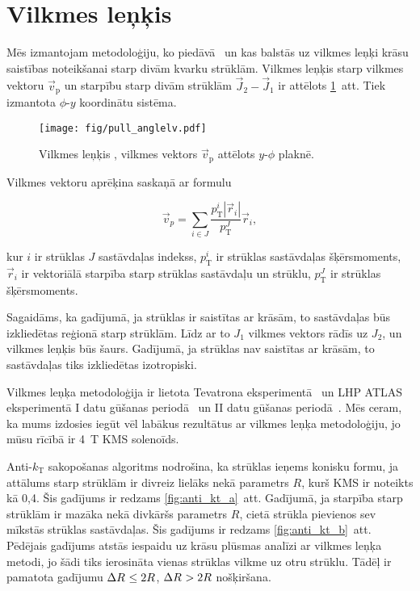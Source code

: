 \section{Vilkmes leņķis}

Mēs izmantojam metodoloģiju, ko piedāvā~\cite{Gallicchio:2010sw} un kas balstās uz vilkmes leņķi krāsu saistības noteikšanai starp divām kvarku strūklām. Vilkmes leņķis \pullangle starp vilkmes vektoru $\vec{v}_{\text{p}}$ un starpību starp divām strūklām $\vec{J}_{2}-\vec{J}_{1}$ ir attēlots \ref{fig:pull_angle}~att. Tiek izmantota $\phi$-$y$ koordinātu sistēma. 

\begin{figure}[hbtp]
  \centering
  \texttt{[image: fig/pull\_anglelv.pdf]}
  \caption{Vilkmes leņķis \pullangle, vilkmes vektors $\vec{v}_{\text{p}}$ attēlots $y$-$\phi$ plaknē.}
  \label{fig:pull_angle}
\end{figure}

Vilkmes vektoru aprēķina saskaņā ar formulu

\begin{equation}
  \vec{v}_{p}=\sum_{i\in J}\frac{p^{i}_{\text{T}}|\vec{r}_{i}|}{p^{J}_{\text{T}}}\vec{r}_{i},
  \label{Eq:pull_angle}
\end{equation}

\noindent kur $i$ ir strūklas $J$ sastāvdaļas indekss, $p^{i}_{\text{T}}$ ir strūklas sastāvdaļas šķērsmoments, $\vec{r}_{i}$ ir vektoriālā starpība starp strūklas sastāvdaļu un strūklu, $p^{J}_{\text{T}}$ ir strūklas šķērsmoments.

Sagaidāms, ka gadījumā, ja strūklas ir saistītas ar krāsām, to sastāvdaļas būs izkliedētas reģionā starp strūklām. Līdz ar to $J_{1}$ vilkmes vektors rādīs uz $J_{2}$, un vilkmes leņķis būs šaurs. Gadījumā, ja strūklas nav saistītas ar krāsām, to sastāvdaļas tiks izkliedētas izotropiski.

Vilkmes leņķa metodoloģija ir lietota Tevatrona \DZERO eksperimentā~\cite{Abazov:2011vh} un LHP ATLAS eksperimentā I datu gūšanas periodā~\cite{Aad:2015lxa} un II datu gūšanas periodā~\cite{ATLAS:2017iaz}. Mēs ceram, ka mums izdosies iegūt vēl labākus rezultātus ar vilkmes leņķa metodoloģiju, jo mūsu rīcībā ir 4~T KMS solenoīds.

Anti-$k_{\text{T}}$ \gls{sakopošanas} algoritms nodrošina, ka strūklas ieņems konisku formu, ja attālums starp strūklām \DeltaR ir divreiz lielāks nekā parametrs $R$, kurš KMS ir noteikts kā 0,4. Šis gadījums ir redzams \ref{fig:anti_kt_a}~att. Gadījumā, ja starpība starp strūklām \DeltaR ir mazāka nekā divkāršs parametrs $R$, \gls{cietā} strūkla pievienos sev mīkstās strūklas sastāvdaļas. Šis gadījums ir redzams \ref{fig:anti_kt_b}~att. Pēdējais gadījums atstās iespaidu uz krāsu plūsmas analīzi ar vilkmes leņķa metodi, jo šādi tiks ierosināta vienas strūklas vilkme uz otru strūklu. Tādēļ ir pamatota gadījumu $\Delta R^{}\leq2R$, $\Delta R^{}>2R$ nošķiršana. 

